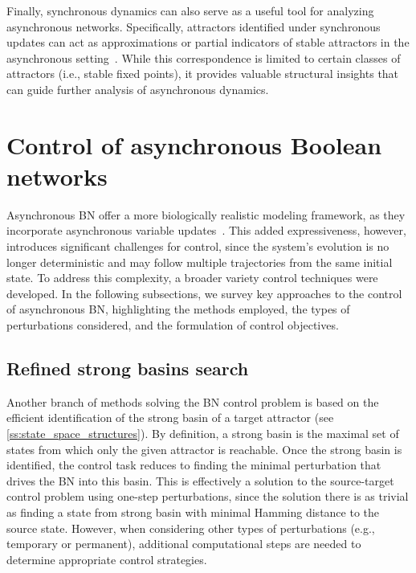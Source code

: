 
Finally, synchronous dynamics can also serve as a useful tool for analyzing asynchronous networks. Specifically, attractors identified under synchronous updates can act as approximations or partial indicators of stable attractors in the asynchronous setting~\cite{Zheng2013}. While this correspondence is limited to certain classes of attractors (i.e., stable fixed points), it provides valuable structural insights that can guide further analysis of asynchronous dynamics.


\section{Control of asynchronous Boolean networks} 
\label{sec:controlAsynchronous}

Asynchronous BN offer a more biologically realistic modeling framework, as they incorporate asynchronous variable updates~\cite{Chaves2005}. This added expressiveness, however, introduces significant challenges for control, since the system's evolution is no longer deterministic and may follow multiple trajectories from the same initial state. To address this complexity, a broader variety control techniques were developed. In the following subsections, we survey key approaches to the control of asynchronous BN, highlighting the methods employed, the types of perturbations considered, and the formulation of control objectives.


\subsection{Refined strong basins search} \label{ss:strongbasinidentification}

Another branch of methods solving the BN control problem is based on the efficient identification of the strong basin of a target attractor (see \autoref{ss:state_space_structures}). By definition, a strong basin is the maximal set of states from which only the given attractor is reachable. Once the strong basin is identified, the control task reduces to finding the minimal perturbation that drives the BN into this basin. This is effectively a solution to the source-target control problem using one-step perturbations, since the solution there is as trivial as finding a state from strong basin with minimal Hamming distance to the source state. However, when considering other types of perturbations (e.g., temporary or permanent), additional computational steps are needed to determine appropriate control strategies.

